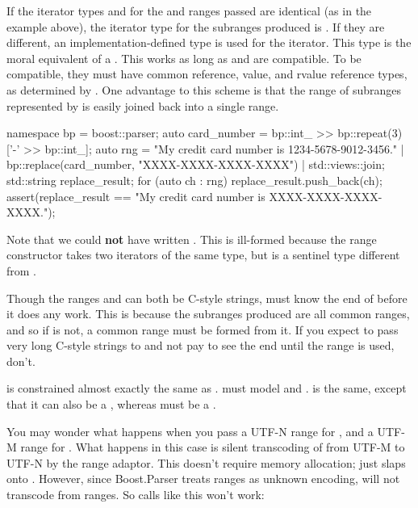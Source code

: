 \documentclass{MyBook}
\begin{document}
If the iterator types  and  for the  and  ranges passed are identical (as in the example above), the iterator type for the subranges produced is . If they are different, an implementation-defined type is used for the iterator. This type is the moral equivalent of a . This works as long as  and  are compatible. To be compatible, they must have common reference, value, and rvalue reference types, as determined by . One advantage to this scheme is that the range of subranges represented by  is easily joined back into a single range.

\begin{code}
namespace bp = boost::parser;
auto card_number = bp::int_ >> bp::repeat(3)['-' >> bp::int_];
auto rng = "My credit card number is 1234-5678-9012-3456." | bp::replace(card_number, "XXXX-XXXX-XXXX-XXXX") | std::views::join;
std::string replace_result;
for (auto ch : rng) {
    replace_result.push_back(ch);
}
assert(replace_result == "My credit card number is XXXX-XXXX-XXXX-XXXX.");
\end{code}

Note that we could \textbf{not} have written . This is ill-formed because the  range constructor takes two iterators of the same type, but  is a sentinel type different from .

Though the ranges  and  can both be C-style strings,  must know the end of  before it does any work. This is because the subranges produced are all common ranges, and so if  is not, a common range must be formed from it. If you expect to pass very long C-style strings to  and not pay to see the end until the range is used, don't.

 is constrained almost exactly the same as .  must model  and .  is the same, except that it can also be a , whereas  must be a .

You may wonder what happens when you pass a UTF-N range for , and a UTF-M range for . What happens in this case is silent transcoding of  from UTF-M to UTF-N by the  range adaptor. This doesn't require memory allocation;  just slaps  onto . However, since Boost.Parser treats  ranges as unknown encoding,  will not transcode from  ranges. So calls like this won't work:
\end{document}
